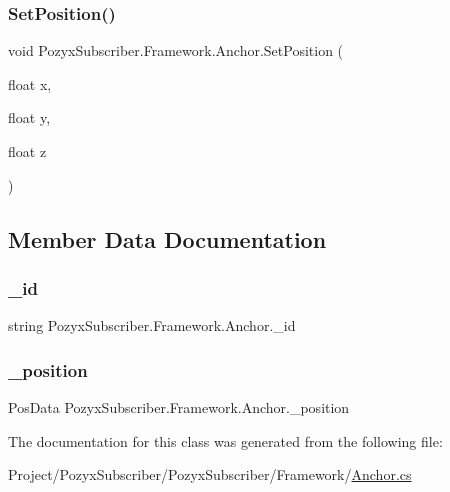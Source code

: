 \subsubsection{\texorpdfstring{Set\+Position()}{SetPosition()}}
{\footnotesize\ttfamily void Pozyx\+Subscriber.\+Framework.\+Anchor.\+Set\+Position (\begin{DoxyParamCaption}\item[{float}]{x,  }\item[{float}]{y,  }\item[{float}]{z }\end{DoxyParamCaption})}



\subsection{Member Data Documentation}
\mbox{\label{class_pozyx_subscriber_1_1_framework_1_1_anchor_a2bd63c7b8f0f8d466e6e4da6a1d89cab}} 
\subsubsection{\texorpdfstring{\+\_\+id}{\_id}}
{\footnotesize\ttfamily string Pozyx\+Subscriber.\+Framework.\+Anchor.\+\_\+id\hspace{0.3cm}{\ttfamily [private]}}

\mbox{\label{class_pozyx_subscriber_1_1_framework_1_1_anchor_ac316ecc8136e9a3081a847c41854e67a}} 
\subsubsection{\texorpdfstring{\+\_\+position}{\_position}}
{\footnotesize\ttfamily Pos\+Data Pozyx\+Subscriber.\+Framework.\+Anchor.\+\_\+position\hspace{0.3cm}{\ttfamily [private]}}



The documentation for this class was generated from the following file\+:\begin{DoxyCompactItemize}
\item 
Project/\+Pozyx\+Subscriber/\+Pozyx\+Subscriber/\+Framework/\hyperlink{_anchor_8cs}{Anchor.\+cs}\end{DoxyCompactItemize}

